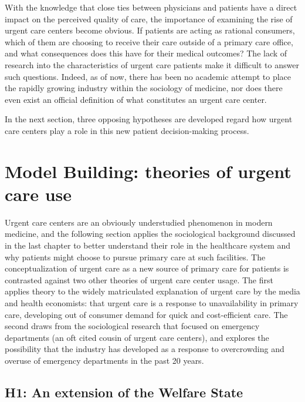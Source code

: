 \documentclass[12pt,twoside]{reedthesis}
\begin{document}
  With the knowledge that close ties between physicians and patients have
  a direct impact on the perceived quality of care, the importance of
  examining the rise of urgent care centers become obvious. If patients
  are acting as rational consumers, which of them are choosing to receive
  their care outside of a primary care office, and what consequences does
  this have for their medical outcomes? The lack of research into the
  characteristics of urgent care patients make it difficult to answer such
  questions. Indeed, as of now, there has been no academic attempt to
  place the rapidly growing industry within the sociology of medicine, nor
  does there even exist an official definition of what constitutes an
  urgent care center.
  
  In the next section, three opposing hypotheses are developed regard how
  urgent care centers play a role in this new patient decision-making
  process.
  
  \chapter*{Model Building: theories of urgent care
  use}\label{model-building-theories-of-urgent-care-use}
  
  \setcounter{chapter}{3} \setcounter{section}{0} \doublespacing
  
  Urgent care centers are an obviously understudied phenomenon in modern
  medicine, and the following section applies the sociological background
  discussed in the last chapter to better understand their role in the
  healthcare system and why patients might choose to pursue primary care
  at such facilities. The conceptualization of urgent care as a new source
  of primary care for patients is contrasted against two other theories of
  urgent care center usage. The first applies theory to the widely
  matriculated explanation of urgent care by the media and health
  economists: that urgent care is a response to unavailability in primary
  care, developing out of consumer demand for quick and cost-efficient
  care. The second draws from the sociological research that focused on
  emergency departments (an oft cited cousin of urgent care centers), and
  explores the possibility that the industry has developed as a response
  to overcrowding and overuse of emergency departments in the past 20
  years.
  
  \section*{H1: An extension of the Welfare
  State}\label{h1-an-extension-of-the-welfare-state}
  
\end{document}
